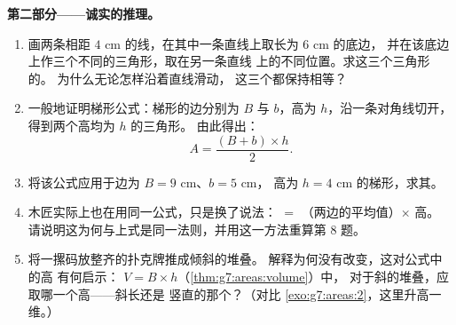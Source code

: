 \begin{problem}[{周末问题——一个著名的“证明”声称
$64 = 65$，借面积与斜率揭穿，
并以比萨与圆环作甜点}]
\medskip
\noindent\textbf{第二部分——诚实的推理。}
\begin{enumerate}[resume]
  \item 画两条相距 $4$ cm 的线，在其中一条直线上取长为 $6$ cm 的底边，
        并在该底边上作三个不同的三角形，取在另一条直线
        上的不同位置。求这三个三角形的。
        为什么无论怎样沿着直线滑动，
        这三个都保持相等？
  \item 一般地证明梯形公式：梯形的边分别为
        $B$ 与 $b$，高为 $h$，沿一条对角线切开，
        得到两个高均为 $h$ 的三角形。
        由此得出：
        \[
        A = \frac{(B + b) \times h}{2} .
        \]
  \item 将该公式应用于边为 $B = 9$ cm、$b = 5$ cm，
        高为 $h = 4$ cm 的梯形，求其。
  \item 木匠实际上也在用同一公式，只是换了说法： $=$
        （两边的平均值）$\times$ 高。
        请说明这为何与上式是同一法则，并用这一方法重算第
        8 题。
  \item 将一摞码放整齐的扑克牌推成倾斜的堆叠。
        解释为何没有改变，这对公式中的高
        有何启示：
        $V = B \times h$（\cref{thm:g7:areas:volume}）中，
        对于斜的堆叠，应取哪一个高——斜长还是
        竖直的那个？（对比
        \cref{exo:g7:areas:2}，这里升高一维。）
\end{enumerate}


\end{problem}
